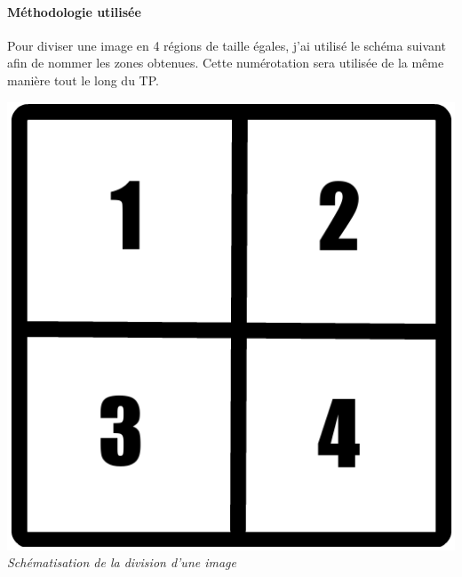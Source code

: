 \documentclass[a4paper,11pt]{article}
\begin{document}
\paragraph{Méthodologie utilisée} Pour diviser une image en 4 régions de taille égales, j'ai utilisé le schéma suivant afin de nommer les zones obtenues. Cette numérotation sera utilisée de la même manière tout le long du TP.
\begin{center}
\includegraphics[scale=0.25]{schema.png}\\
\textit{Schématisation de la division d'une image}
\end{center}
\end{document}
